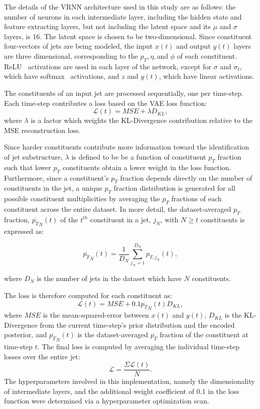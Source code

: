 \documentclass[11pt, a4paper]{article}
\begin{document}
The details of the VRNN architecture used in this study are as follows: the number of neurons in each intermediate layer, including the hidden state and feature extracting layers, but not including the latent space and its $\mu$ and $\sigma$ layers, is 16. The latent space is chosen to be two-dimensional. Since constituent four-vectors of jets are being modeled, the input $x(t)$ and output $y(t)$ layers are three dimensional, corresponding to the $p_{T}, \eta, $and $\phi$ of each constituent. ReLU~\cite{activations} activations are used in each layer of the network, except for $\sigma$ and $\sigma_{t}$, which have softmax~\cite{activations} activations, and $z$ and $y(t)$, which have linear activations. 

The constituents of an input jet are processed sequentially, one per time-step. 
Each time-step contributes a loss based on the VAE loss function: 
\begin{equation}
\mathcal{L}(t) = MSE + \lambda D_{KL},
\end{equation}
where $\lambda$ is a factor which weights the KL-Divergence contribution relative to the MSE reconstruction loss.

Since harder constituents contribute more information toward the identification of jet substructure, $\lambda$ is defined to be be a function of constituent $p_{T}$ fraction such that lower $p_{T}$ constituents obtain a lower weight in the loss function. 
Furthermore, since a constituent's $p_{T}$ fraction depends directly on the number of constituents in the jet, a unique $p_{T}$ fraction distribution is generated for all possible constituent multiplicities by averaging the $p_{T}$ fractions of each constituent across the entire dataset. In more detail, the dataset-averaged $p_{T}$ fraction, $\overline{p_{T}}_{N}(t)$ of the $t^{th}$ constituent in a jet, $j_{N}$, with $N \geq t$ constituents is expressed as:


\begin{equation}
\overline{p_{T}}_{N}(t)=\frac{1}{D_{N}}\displaystyle\sum_{j_{N} = 1}^{D_{N}} p_{T,j_{N}}(t),
\end{equation}

where $D_{N}$ is the number of jets in the dataset which have $N$ constituents.

The loss is therefore computed for each constituent as:
\begin{equation}
\mathcal{L}(t)=MSE+0.1\overline{p_{T}}_{N}(t)D_{KL},
\end{equation}
where $MSE$ is the mean-squared-error between $x(t)$ and $y(t)$, $D_{KL}$ is the KL-Divergence from the current time-step's prior distribution and the encoded posterior, and $\overline{p_T}_{N}(t)$ is the dataset-averaged $p_T$ fraction of the constituent at time-step $t$. The final loss is computed by averaging the individual time-step losses over the entire jet: 
\begin{equation}
\mathcal{L} = \frac{\Sigma \mathcal{L}(t)}{N}.
\end{equation} 
The hyperparameters involved in this implementation, namely the dimensionality of intermediate layers, and the additional weight coefficient of 0.1 in the loss function were determined via a hyperparameter optimization scan. 
\end{document}
